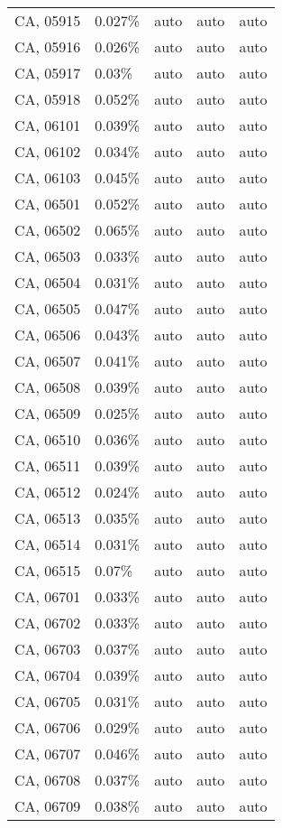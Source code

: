 \begin{longtable}[]{@{}lllll@{}}
CA, 05915 & 0.027\% & auto & auto & auto \\
CA, 05916 & 0.026\% & auto & auto & auto \\
CA, 05917 & 0.03\% & auto & auto & auto \\
CA, 05918 & 0.052\% & auto & auto & auto \\
CA, 06101 & 0.039\% & auto & auto & auto \\
CA, 06102 & 0.034\% & auto & auto & auto \\
CA, 06103 & 0.045\% & auto & auto & auto \\
CA, 06501 & 0.052\% & auto & auto & auto \\
CA, 06502 & 0.065\% & auto & auto & auto \\
CA, 06503 & 0.033\% & auto & auto & auto \\
CA, 06504 & 0.031\% & auto & auto & auto \\
CA, 06505 & 0.047\% & auto & auto & auto \\
CA, 06506 & 0.043\% & auto & auto & auto \\
CA, 06507 & 0.041\% & auto & auto & auto \\
CA, 06508 & 0.039\% & auto & auto & auto \\
CA, 06509 & 0.025\% & auto & auto & auto \\
CA, 06510 & 0.036\% & auto & auto & auto \\
CA, 06511 & 0.039\% & auto & auto & auto \\
CA, 06512 & 0.024\% & auto & auto & auto \\
CA, 06513 & 0.035\% & auto & auto & auto \\
CA, 06514 & 0.031\% & auto & auto & auto \\
CA, 06515 & 0.07\% & auto & auto & auto \\
CA, 06701 & 0.033\% & auto & auto & auto \\
CA, 06702 & 0.033\% & auto & auto & auto \\
CA, 06703 & 0.037\% & auto & auto & auto \\
CA, 06704 & 0.039\% & auto & auto & auto \\
CA, 06705 & 0.031\% & auto & auto & auto \\
CA, 06706 & 0.029\% & auto & auto & auto \\
CA, 06707 & 0.046\% & auto & auto & auto \\
CA, 06708 & 0.037\% & auto & auto & auto \\
CA, 06709 & 0.038\% & auto & auto & auto \\

\end{longtable}
